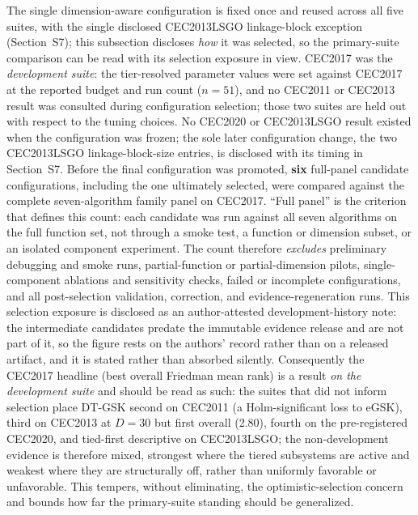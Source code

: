\documentclass[algorithms,article,submit,moreauthors,pdftex]{Definitions/mdpi}
\newcommand{\dtgsk}{DT-GSK}
\newcommand{\egsk}{eGSK}
\begin{document}
The single dimension-aware configuration is fixed once and reused across
all five suites, with the single disclosed CEC2013LSGO linkage-block
exception (Section~S7); this subsection discloses \emph{how} it was selected, so the
primary-suite comparison can be read with its selection exposure in view.
CEC2017 was the \emph{development suite}: the tier-resolved parameter values
were set against CEC2017 at the reported budget and run count ($n=51$), and no
CEC2011 or CEC2013 result was consulted during configuration selection; those
two suites are held out with respect to the tuning choices. No CEC2020 or
CEC2013LSGO result existed when the configuration was frozen; the sole
later configuration change, the two CEC2013LSGO linkage-block-size
entries, is disclosed with its timing in Section~S7. Before the final
configuration was promoted, \textbf{six} full-panel candidate configurations,
including the one ultimately selected, were
compared against the complete seven-algorithm family panel on CEC2017. ``Full
panel'' is the criterion that defines this count: each candidate was run against
all seven algorithms on the full function set, not through a smoke test, a
function or dimension subset, or an isolated component experiment. The count
therefore \emph{excludes} preliminary debugging and smoke runs,
partial-function or partial-dimension pilots, single-component ablations and
sensitivity checks, failed or incomplete configurations, and all post-selection
validation, correction, and evidence-regeneration runs. This selection exposure
is disclosed as an author-attested development-history note: the
intermediate candidates predate the immutable evidence release and are not part
of it, so the figure rests on the authors' record rather than on a released
artifact, and it is stated rather than absorbed silently. Consequently the CEC2017 headline (best overall Friedman mean rank)
is a result \emph{on the development suite} and should be read as such: the
suites that did not inform selection place \dtgsk{} second on CEC2011 (a
Holm-significant loss to \egsk{}), third on CEC2013 at $D = 30$ but first
overall (2.80), fourth on the pre-registered CEC2020, and tied-first
descriptive on CEC2013LSGO; the non-development evidence is therefore
mixed, strongest where the tiered subsystems are active and weakest
where they are structurally off, rather than uniformly favorable or
unfavorable. This tempers,
without eliminating, the optimistic-selection concern and bounds how far the
primary-suite standing should be generalized.
\end{document}
